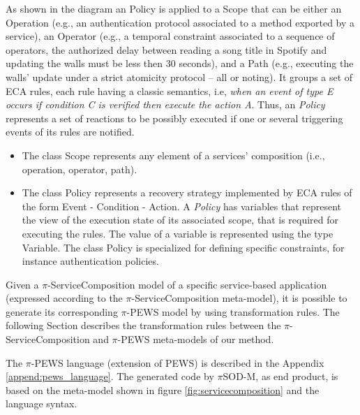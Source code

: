 As shown in the diagram an {\sc Policy} is applied to a {\sc Scope} that can be
either an {\sc Operation} (e.g., an authentication protocol associated to a
method exported by a service),  an {\sc Operator} (e.g., a temporal constraint
associated to a sequence of operators, the authorized delay between reading a
song title in Spotify and updating the walls must be less then 30 seconds), and
a {\sc Path} (e.g., executing the walls' update under a strict atomicity
protocol -- all or noting).  It groups a set of ECA rules, each rule having a
classic semantics, i.e, {\em when an event of type E occurs if  condition C is
verified then execute the action A}.  Thus, an {\em Policy} represents a set of
reactions to be possibly executed if one or several triggering events of its
rules are notified.

\begin{itemize}
\item The class {\sc Scope} represents any element of a services' composition (i.e., operation, operator, path).
\item The class {\sc Policy} represents a recovery strategy implemented by ECA
rules of the form {\sc Event} - {\sc Condition} - {\sc Action}. A {\em Policy}
has variables that represent the view of the execution state of its associated
scope, that is required for executing the rules. The value of a variable is
represented using the type {\sc Variable}. The class {\sc Policy} is specialized
for defining specific constraints, for instance authentication policies.
\end{itemize}

Given a $\pi$-ServiceComposition model of a specific service-based application
(expressed according to the $\pi$-ServiceComposition meta-model), it is possible
to generate its corresponding $\pi$-PEWS model by using transformation
rules. The following Section describes the transformation rules between the
$\pi$-ServiceComposition and $\pi$-PEWS meta-models of our method.

The $\pi$-PEWS language (extension of PEWS) is described in the Appendix
\ref{append:pews_language}. The generated code by $\pi$SOD-M, as end product, is
based on the meta-model shown in figure \ref{fig:servicecomposition} and the
language syntax.
 

